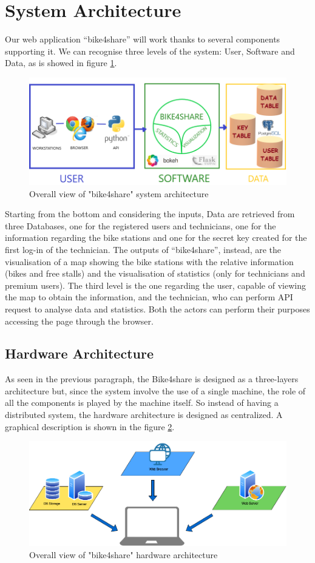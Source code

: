 \documentclass{article}
\begin{document}
\section{System Architecture}
Our web application “bike4share” will work thanks to several components supporting it.
We can recognise three levels of the system: User, Software and Data, as is showed in figure \ref{fig:schema}. 
\begin{figure}[h]
    \centering
    \includegraphics[width=0.75\linewidth]{image/BIKE4SHARE_SCHEMA.png}
    \caption{Overall view of "bike4share" system architecture}
    \label{fig:schema}
\end{figure}
Starting from the bottom and considering the inputs, Data are retrieved from three Databases, one for the registered users and technicians, one for the information regarding the bike stations and one for the secret key created for the first log-in of the technician.
The outputs of “bike4share”, instead, are the visualisation of a map showing the bike stations with the relative information (bikes and free stalls) and the visualisation of statistics (only for technicians and premium users). 
The third level is the one regarding the user, capable of viewing the map to obtain the information, and the technician, who can perform API request to analyse data and statistics. Both the actors can perform their purposes accessing the page through the browser.
\subsection{Hardware Architecture}
As seen in the previous paragraph, the Bike4share is designed as a three-layers architecture but, since the system involve the use of a single machine, the role of all the components is played by the machine itself. So instead of having a distributed system, the hardware architecture is designed as centralized.  A graphical description is shown in the figure \ref{fig:over}.
\begin{figure}[h]
    \centering
    \includegraphics[width=0.55\linewidth]{image/hardware_architecture.png}
    \caption{Overall view of "bike4share" hardware architecture}
    \label{fig:over}
\end{figure}
\end{document}
